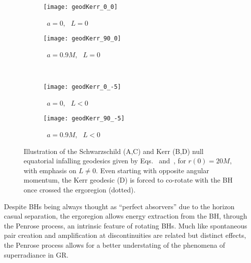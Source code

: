 \begin{figure}[h]
    \centering
    \vspace{0.5cm}
    \begin{subfigure}[c]{0.4\textwidth}
        \texttt{[image: geodKerr\_0\_0]}
        \caption{ ~$a=0$, ~$L=0$}
    \end{subfigure}
    \hspace{1cm}
    \begin{subfigure}[c]{0.4\textwidth}
        \texttt{[image: geodKerr\_90\_0]}
        \caption{~$a=0.9 M$, ~$L=0$}
    \end{subfigure}
    \\
    \vspace{0.3cm}
    \begin{subfigure}[c]{0.4\textwidth}
        \texttt{[image: geodKerr\_0\_-5]}
        \caption{~$a=0$, ~$L<0$}
    \end{subfigure}
    \hspace{1cm}
    \begin{subfigure}[c]{0.4\textwidth}
        \texttt{[image: geodKerr\_90\_-5]}
        \caption{~$a=0.9 M$, ~$L<0$}
    \end{subfigure}
    \caption{Illustration of the Schwarzschild ({\footnotesize\textsc{A,C}}) and Kerr ({\footnotesize\textsc{B,D}}) null equatorial infalling geodesics given by Eqs.~ and~, for $r(0)=20 M$, with emphasis on $L\ne0$. Even starting with opposite angular momentum, the Kerr  geodesic ({\footnotesize\textsc{D}}) is forced to co-rotate with the BH once crossed the ergoregion (dotted).}
    \label{fig2:geodesics}
\end{figure}

Despite BHs being always thought as ``perfect absorvers'' due to the horizon casual separation, the ergoregion allows energy extraction from the BH, through the Penrose process, an intrinsic feature of rotating BHs.
Much like spontaneous pair creation and amplification at discontinuities are related but distinct effects, the Penrose process allows for a better understating of the phenomena of superradiance in GR. 

